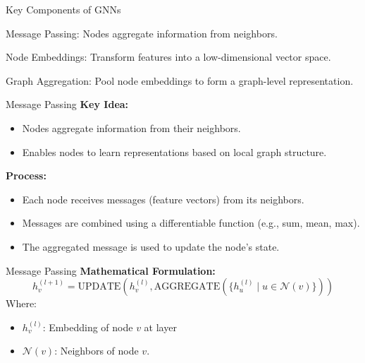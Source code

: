 \documentclass{beamer}
\begin{document}
\begin{frame}{Key Components of GNNs}
    \begin{block}{Message Passing:}
        Nodes aggregate information from neighbors.
    \end{block}

    \begin{block}{Node Embeddings:}
        Transform features into a low-dimensional vector space.
    \end{block}

    \begin{block}{Graph Aggregation:}
        Pool node embeddings to form a graph-level representation.
    \end{block}

\end{frame}
\begin{frame}{Message Passing}
    \textbf{Key Idea:}
    \begin{itemize}
        \item Nodes aggregate information from their neighbors.
        \item Enables nodes to learn representations based on local graph structure.
    \end{itemize}

    \vspace{0.5cm}

    \textbf{Process:}
    \begin{itemize}
        \item Each node receives messages (feature vectors) from its neighbors.
        \item Messages are combined using a differentiable function (e.g., sum, mean, max).
        \item The aggregated message is used to update the node's state.
    \end{itemize}

 \end{frame}

 \begin{frame}{Message Passing}
    \textbf{Mathematical Formulation:}
    \[
    h_v^{(l+1)} = \text{UPDATE}\left(h_v^{(l)}, \text{AGGREGATE}\left(\{h_u^{(l)} \mid u \in \mathcal{N}(v)\}\right)\right)
    \]
    Where:
    \begin{itemize}
        \item \( h_v^{(l)} \): Embedding of node \( v \) at layer
        \item \( \mathcal{N}(v) \): Neighbors of node \( v \).
    \end{itemize}
\end{frame}
\end{document}
